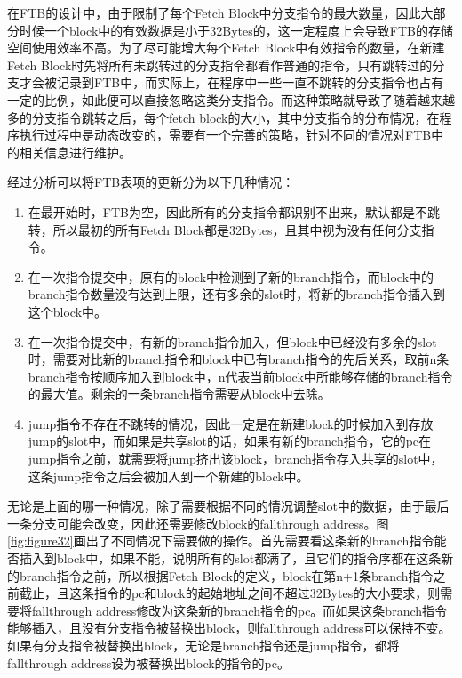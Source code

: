 在FTB的设计中，由于限制了每个Fetch Block中分支指令的最大数量，因此大部分时候一个block中的有效数据是小于32Bytes的，这一定程度上会导致FTB的存储空间使用效率不高。为了尽可能增大每个Fetch Block中有效指令的数量，在新建Fetch Block时先将所有未跳转过的分支指令都看作普通的指令，只有跳转过的分支才会被记录到FTB中，而实际上，在程序中一些一直不跳转的分支指令也占有一定的比例，如此便可以直接忽略这类分支指令。而这种策略就导致了随着越来越多的分支指令跳转之后，每个fetch block的大小，其中分支指令的分布情况，在程序执行过程中是动态改变的，需要有一个完善的策略，针对不同的情况对FTB中的相关信息进行维护。

经过分析可以将FTB表项的更新分为以下几种情况：

\begin{enumerate}
	\item 在最开始时，FTB为空，因此所有的分支指令都识别不出来，默认都是不跳转，所以最初的所有Fetch Block都是32Bytes，且其中视为没有任何分支指令。
	\item 在一次指令提交中，原有的block中检测到了新的branch指令，而block中的branch指令数量没有达到上限，还有多余的slot时，将新的branch指令插入到这个block中。
	\item 在一次指令提交中，有新的branch指令加入，但block中已经没有多余的slot时，需要对比新的branch指令和block中已有branch指令的先后关系，取前n条branch指令按顺序加入到block中，n代表当前block中所能够存储的branch指令的最大值。剩余的一条branch指令需要从block中去除。
	\item jump指令不存在不跳转的情况，因此一定是在新建block的时候加入到存放jump的slot中，而如果是共享slot的话，如果有新的branch指令，它的pc在jump指令之前，就需要将jump挤出该block，branch指令存入共享的slot中，这条jump指令之后会被加入到一个新建的block中。
\end{enumerate}


无论是上面的哪一种情况，除了需要根据不同的情况调整slot中的数据，由于最后一条分支可能会改变，因此还需要修改block的fallthrough address。图\ref{fig:figure32}画出了不同情况下需要做的操作。首先需要看这条新的branch指令能否插入到block中，如果不能，说明所有的slot都满了，且它们的指令序都在这条新的branch指令之前，所以根据Fetch Block的定义，block在第n+1条branch指令之前截止，且这条指令的pc和block的起始地址之间不超过32Bytes的大小要求，则需要将fallthrough address修改为这条新的branch指令的pc。而如果这条branch指令能够插入，且没有分支指令被替换出block，则fallthrough address可以保持不变。如果有分支指令被替换出block，无论是branch指令还是jump指令，都将fallthrough address设为被替换出block的指令的pc。

